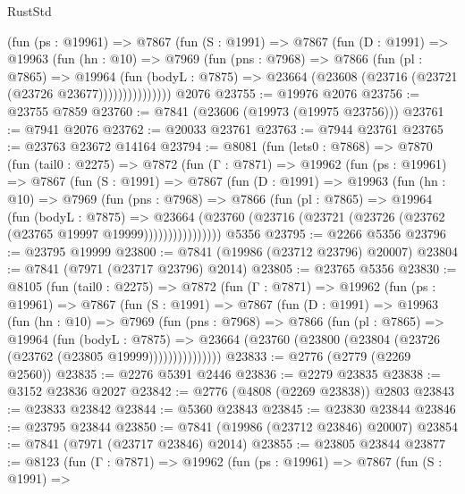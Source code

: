 \begin{lexlean}{RustStd}
\begin{coremodule}
            (fun (ps : @19961) =>
            @7867
              (fun (S : @1991) =>
              @7867
                (fun (D : @1991) =>
                @19963
                  (fun (hn : @10) =>
                  @7969
                    (fun (pns : @7968) =>
                    @7866
                      (fun (pl : @7865) =>
                      @19964
                        (fun (bodyL : @7875) =>
                        @23664 (@23608 (@23716 (@23721 (@23726 @23677)))))))))))))))
    @2076
@23755 := @19976 @2076
@23756 := @23755 @7859
@23760 := @7841 (@23606 (@19973 (@19975 @23756)))
@23761 := @7941 @2076
@23762 := @20033 @23761
@23763 := @7944 @23761
@23765 := @23763 @23672 @14164
@23794 := @8081
    (fun (lets0 : @7868) =>
    @7870
      (fun (tail0 : @2275) =>
      @7872
        (fun (Γ : @7871) =>
        @19962
          (fun (ps : @19961) =>
          @7867
            (fun (S : @1991) =>
            @7867
              (fun (D : @1991) =>
              @19963
                (fun (hn : @10) =>
                @7969
                  (fun (pns : @7968) =>
                  @7866
                    (fun (pl : @7865) =>
                    @19964
                      (fun (bodyL : @7875) =>
                      @23664
                        (@23760
                          (@23716 (@23721 (@23726 (@23762 (@23765 @19997 @19999))))))))))))))))
    @5356
@23795 := @2266 @5356
@23796 := @23795 @19999
@23800 := @7841 (@19986 (@23712 @23796) @20007)
@23804 := @7841 (@7971 (@23717 @23796) @2014)
@23805 := @23765 @5356
@23830 := @8105
    (fun (tail0 : @2275) =>
    @7872
      (fun (Γ : @7871) =>
      @19962
        (fun (ps : @19961) =>
        @7867
          (fun (S : @1991) =>
          @7867
            (fun (D : @1991) =>
            @19963
              (fun (hn : @10) =>
              @7969
                (fun (pns : @7968) =>
                @7866
                  (fun (pl : @7865) =>
                  @19964
                    (fun (bodyL : @7875) =>
                    @23664 (@23760 (@23800 (@23804 (@23726 (@23762 (@23805 @19999)))))))))))))))
@23833 := @2776 (@2779 (@2269 @2560))
@23835 := @2276 @5391 @2446
@23836 := @2279 @23835
@23838 := @3152 @23836 @2027
@23842 := @2776 (@4808 (@2269 @23838)) @2803
@23843 := @23833 @23842
@23844 := @5360 @23843
@23845 := @23830 @23844
@23846 := @23795 @23844
@23850 := @7841 (@19986 (@23712 @23846) @20007)
@23854 := @7841 (@7971 (@23717 @23846) @2014)
@23855 := @23805 @23844
@23877 := @8123
    (fun (Γ : @7871) =>
    @19962
      (fun (ps : @19961) =>
      @7867
        (fun (S : @1991) =>

\end{coremodule}
\end{lexlean}

